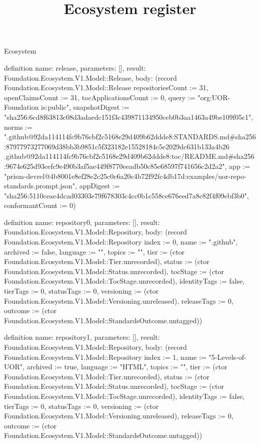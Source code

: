 \begin{lexlean}{Ecosystem}
\title{Ecosystem register}
\begin{semanticmodule}
definition{
  name: release,
  parameters: [],
  result: Foundation.Ecosystem.V1.Model::Release,
  body: (record Foundation.Ecosystem.V1.Model::Release {repositoriesCount := 31, openClaimsCount := 31, tocApplicationsCount := 0, query := "org:UOR-Foundation is:public", snapshotDigest := "sha256:6cd8f63813c08d3adaedc151f3c439871134950ceb0b3aa1463a49be109f05c1", norms := ".github@92da114114fc9b76cbf2c5168e29d409b62ddde8:STANDARDS.md#sha256:87977973277069d38bb3b9851c5f323182e15528184c5e2029dc631b133a4b26 .github@92da114114fc9b76cbf2c5168e29d409b62ddde8:toc/README.md#sha256:9674e625d93cefc9e490b3af5ae449f8770eeadb50c85e68597f741656c2d2a2", app := "prism-devrel@4b8001e8ef28e2c25c0c6a20c4b72f92fc4db17d:examples/uor-repo-standards.prompt.json", appDigest := "sha256:5110ceae4dcad03303e79f678303c4cc0b1c558ce676eed7a8c82f4f09ebf3b0", conformantCount := 0})
}

definition{
  name: repository0,
  parameters: [],
  result: Foundation.Ecosystem.V1.Model::Repository,
  body: (record Foundation.Ecosystem.V1.Model::Repository {index := 0, name := ".github", archived := false, language := "", topics := "", tier := (ctor Foundation.Ecosystem.V1.Model::Tier.unrecorded), status := (ctor Foundation.Ecosystem.V1.Model::Status.unrecorded), tocStage := (ctor Foundation.Ecosystem.V1.Model::TocStage.unrecorded), identityTags := false, tierTags := 0, statusTags := 0, versioning := (ctor Foundation.Ecosystem.V1.Model::Versioning.unreleased), releaseTags := 0, outcome := (ctor Foundation.Ecosystem.V1.Model::StandardsOutcome.untagged)})
}

definition{
  name: repository1,
  parameters: [],
  result: Foundation.Ecosystem.V1.Model::Repository,
  body: (record Foundation.Ecosystem.V1.Model::Repository {index := 1, name := "5-Levels-of-UOR", archived := true, language := "HTML", topics := "", tier := (ctor Foundation.Ecosystem.V1.Model::Tier.unrecorded), status := (ctor Foundation.Ecosystem.V1.Model::Status.unrecorded), tocStage := (ctor Foundation.Ecosystem.V1.Model::TocStage.unrecorded), identityTags := false, tierTags := 0, statusTags := 0, versioning := (ctor Foundation.Ecosystem.V1.Model::Versioning.unreleased), releaseTags := 0, outcome := (ctor Foundation.Ecosystem.V1.Model::StandardsOutcome.untagged)})
}


\end{semanticmodule}
\end{lexlean}
